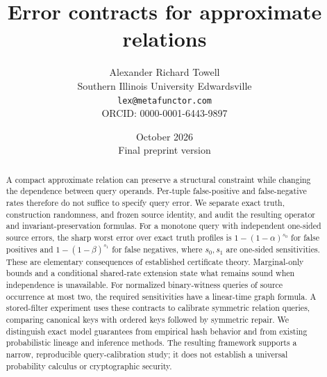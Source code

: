\documentclass[11pt,final,hidelinks]{article}
\title{Error contracts for approximate relations}
\author{Alexander Richard Towell\\
Southern Illinois University Edwardsville\\
\texttt{lex@metafunctor.com}\\
\small ORCID: 0000-0001-6443-9897}
\date{October 2026\\\small Final preprint version}
\begin{document}
\maketitle
\begin{abstract}
A compact approximate relation can preserve a structural constraint while
changing the dependence between query operands. Per-tuple false-positive and
false-negative rates therefore do not suffice to specify query error.
We separate exact truth, construction randomness, and frozen source identity,
and audit the resulting operator and invariant-preservation formulas.
For a monotone query with independent one-sided source errors, the sharp
worst error over exact truth profiles is $1-(1-\alpha)^{s_0}$ for false
positives and $1-(1-\beta)^{s_1}$ for false negatives, where $s_0,s_1$ are
one-sided sensitivities. These are elementary consequences of established
certificate theory. Marginal-only bounds and a conditional shared-rate
extension state what remains sound when independence is unavailable.
For normalized binary-witness queries of source occurrence at most two,
the required sensitivities have a linear-time graph formula. A stored-filter
experiment uses these contracts to calibrate symmetric relation queries,
comparing canonical keys with ordered keys followed by symmetric repair.
We distinguish exact model guarantees from empirical hash behavior and
from existing probabilistic lineage and inference methods. The resulting
framework supports a narrow, reproducible query-calibration study; it does
not establish a universal probability calculus or cryptographic security.
\end{abstract}




\tableofcontents
{}


\newcommand{\fiber}{\phi}














\end{document}
